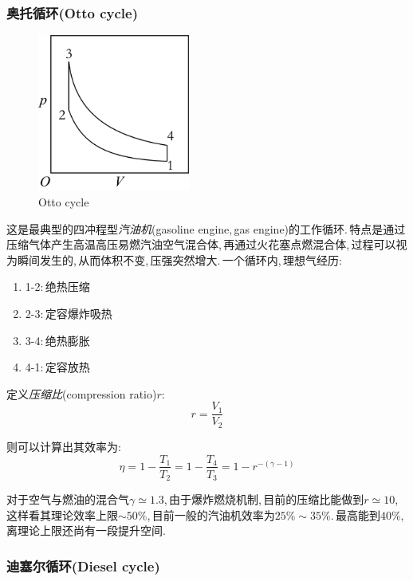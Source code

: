 \subsubsection{\hei 奥托循环(Otto cycle)}
\begin{figure}
\centering
\includegraphics[width=5cm]{image/5-2-7.png}
\caption{Otto cycle}
\end{figure}
这是最典型的四冲程型\emph{汽油机}(gasoline engine,\,gas engine)的工作循环.\,特点是通过压缩气体产生高温高压易燃汽油空气混合体,\,再通过火花塞点燃混合体,\,过程可以视为瞬间发生的,\,从而体积不变,\,压强突然增大.\,一个循环内,\,理想气经历:
\begin{enumerate}[i]
	\item 1-2:\,绝热压缩
	\item 2-3:\,定容爆炸吸热
	\item 3-4:\,绝热膨胀
	\item 4-1:\,定容放热
\end{enumerate}

定义\emph{压缩比}(compression ratio)$r$:
\[r=\frac{V_1}{V_2}\]

则可以计算出其效率为:
\[\eta=1-\frac{T_1}{T_2}=1-\frac{T_4}{T_3}=1-r^{-(\gamma-1)}\]

对于空气与燃油的混合气$\gamma\simeq 1.3$,\,由于爆炸燃烧机制,\,目前的压缩比能做到$r\simeq 10$,\,这样看其理论效率上限$\sim 50\%$,\,目前一般的汽油机效率为$25\%\sim35\%$.\,最高能到$40\%$,\,离理论上限还尚有一段提升空间.

\npg{0cm}

\vspace{1cm}

\subsubsection{\hei 迪塞尔循环(Diesel cycle)}

